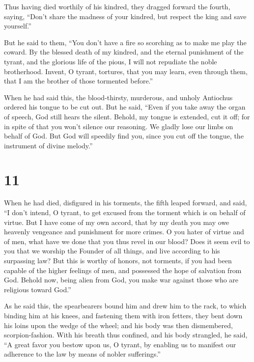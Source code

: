  Thus having died worthily of his kindred, they dragged
forward the fourth, saying,  ``Don't share the madness of
your kindred, but respect the king and save yourself.''

 But he said to them, ``You don't have a fire so
scorching as to make me play the coward.  By the blessed
death of my kindred, and the eternal punishment of the tyrant, and the
glorious life of the pious, I will not repudiate the noble brotherhood.
 Invent, O tyrant, tortures, that you may learn, even
through them, that I am the brother of those tormented before.''

 When he had said this, the blood-thirsty, murderous, and
unholy Antiochus ordered his tongue to be cut out.  But
he said, ``Even if you take away the organ of speech, God still hears
the silent.  Behold, my tongue is extended, cut it off;
for in spite of that you won't silence our reasoning.  We
gladly lose our limbs on behalf of God.  But God will
speedily find you, since you cut off the tongue, the instrument of
divine melody.''

\hypertarget{section-10}{%
\section{11}\label{section-10}}

 When he had died, disfigured in his torments, the fifth
leaped forward, and said,  ``I don't intend, O tyrant, to
get excused from the torment which is on behalf of virtue.
 But I have come of my own accord, that by my death you
may owe heavenly vengeance and punishment for more crimes.
 O you hater of virtue and of men, what have we done that
you thus revel in our blood?  Does it seem evil to you
that we worship the Founder of all things, and live according to his
surpassing law?  But this is worthy of honors, not
torments,  if you had been capable of the higher feelings
of men, and possessed the hope of salvation from God. 
Behold now, being alien from God, you make war against those who are
religious toward God.''

 As he said this, the spearbearers bound him and drew him
to the rack,  to which binding him at his knees, and
fastening them with iron fetters, they bent down his loins upon the
wedge of the wheel; and his body was then dismembered, scorpion-fashion.
 With his breath thus confined, and his body strangled,
he said,  ``A great favor you bestow upon us, O tyrant,
by enabling us to manifest our adherence to the law by means of nobler
sufferings.''

